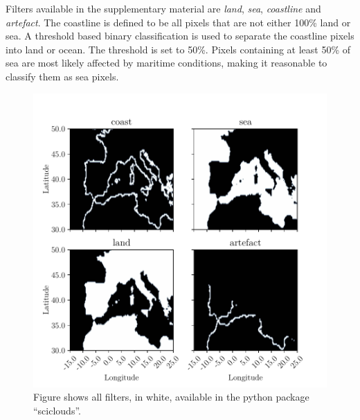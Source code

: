 Filters available in the supplementary material are \textit{land}, \textit{sea}, \textit{coastline} and \textit{artefact}. The coastline is defined to be all pixels that are not either 100\% land or sea. A threshold based binary classification is used to separate the coastline pixels into land or ocean. The threshold is set to 50\%. Pixels containing at least 50\% of sea are most likely affected by maritime conditions, making it reasonable to classify them as sea pixels.
\begin{figure}
    \centering
    \includegraphics{python_figs/filters.pdf}
    \caption{Figure shows all filters, in white, available in the python package ``sciclouds''.}
    \label{fig:filters_subplot}
\end{figure}

